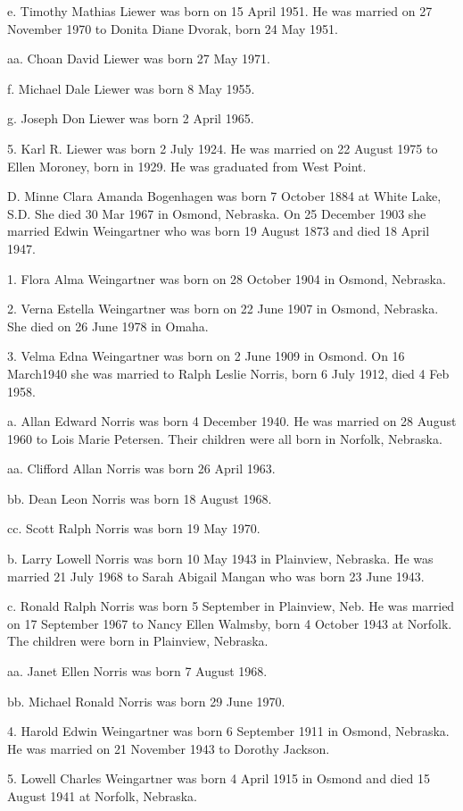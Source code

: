 \documentclass[a4paper]{article}
\begin{document}
e. Timothy Mathias Liewer was born on 15 April  1951.  He was married on 27 November 1970 to Donita Diane Dvorak, born 24 May 1951.
 
aa. Choan David Liewer was born 27 May 1971.

f. Michael Dale Liewer was born 8 May 1955.

g. Joseph Don Liewer was born 2 April 1965.

5. Karl R. Liewer was born 2 July 1924.  He was married on 22 August 1975 to Ellen Moroney, born in 1929.  He was graduated from West Point.    

D. Minne Clara Amanda Bogenhagen was born 7 October 1884 at White Lake, S.D.  She died 30 Mar 1967 in Osmond, Nebraska.  On 25 December 1903 she married Edwin Weingartner who was born 19 August 1873 and died 18 April 1947.

1. Flora Alma Weingartner was born on 28 October 1904 in Osmond, Nebraska.

2. Verna Estella Weingartner was born on 22 June 1907 in Osmond, Nebraska. She died on 26 June 1978 in Omaha.

3. Velma Edna Weingartner was born on 2 June 1909 in Osmond.  On 16 March1940 she was married to Ralph Leslie Norris, born 6 July 1912, died 4 Feb 1958.

a. Allan Edward Norris was born 4 December 1940.  He was married on 28 August 1960 to Lois Marie Petersen.  Their children were all born in Norfolk, Nebraska.

aa. Clifford Allan Norris was born 26 April 1963.

bb. Dean Leon Norris was born 18 August 1968.

cc. Scott Ralph Norris was born 19 May 1970.

b. Larry Lowell Norris was  born 10 May 1943 in Plainview, Nebraska. He was married 21 July 1968 to Sarah Abigail Mangan who was born 23 June 1943.

c. Ronald Ralph Norris was born 5 September in Plainview, Neb. He was married on 17 September 1967 to Nancy Ellen Walmsby, born 4 October 1943 at Norfolk.  The children were born in Plainview, Nebraska.

aa. Janet Ellen Norris was born 7 August 1968.

bb. Michael Ronald Norris was born 29 June 1970.

4. Harold Edwin Weingartner was born 6 September 1911 in Osmond, Nebraska. He was married on 21 November 1943 to Dorothy Jackson.

5. Lowell Charles Weingartner was born 4 April 1915 in Osmond and died 15 August 1941 at Norfolk, Nebraska.
\end{document}

